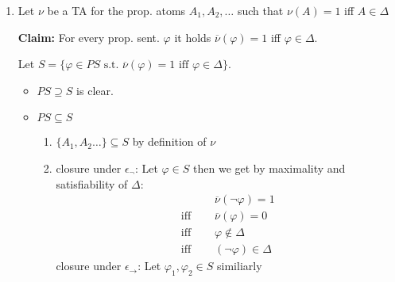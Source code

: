 {\begin{enumerate}
        \begin{enumerate}
            \item $\Sigma\subseteq \Delta$
            \item (Maximality): for every prop. sent. $\alpha$ it holds $\alpha\in \Delta$ or $\lnot \alpha\in \Delta$
            \item (Satisfiability): $\Delta$ is finitely satisfiable. For every finite subset there exists a $\Delta_n$ which is a superset.
        \end{enumerate}
        \item Let $\nu$ be a TA for the prop. atoms $A_1, A_2,\dots$ such that $\nu(A) = 1$ iff $A\in \Delta$
        
        \textbf{Claim:} For every prop. sent. $\varphi$ it holds $\overline{\nu}(\varphi) =1 $ iff $\varphi\in\Delta$.
        \begin{claimproof}
            Let $S = \{\varphi \in PS \text{ s.t. } \overline{\nu}(\varphi) = 1 \text{ iff } \varphi \in \Delta\}$. \\
            \begin{itemize}
                \item $PS\supseteq S$ is clear.
                \item $PS\subseteq S$ 
                \begin{enumerate}
                    \item $\{A_1,A_2\dots\}\subseteq S$ by definition of $\nu$
                    \item closure under $\epsilon_\lnot$: Let $\varphi\in S$ then we get by maximality and satisfiability of $\Delta$: 
                    \begin{equation*}
                        \begin{split}
                            &\overline{\nu}(\lnot\varphi) = 1\\
                            \text{iff }\quad&\overline{\nu}(\varphi) = 0\\
                            \text{iff }\quad& \varphi \notin \Delta\\
                            \text{iff }\quad& (\lnot \varphi)\in \Delta
                        \end{split}
                    \end{equation*}
                    closure under $\epsilon_\to$: Let $\varphi_1,\varphi_2\in S$ similiarly
                    \begin{equation*}
                        \begin{split}

\end{split}
\end{equation*}
\end{enumerate}
\end{itemize}
\end{claimproof}
\end{enumerate}}
